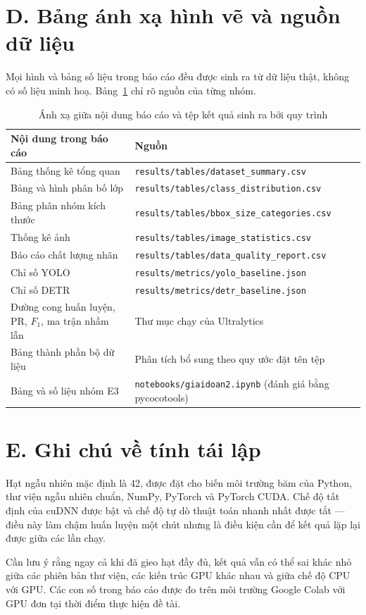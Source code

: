 \section*{D. Bảng ánh xạ hình vẽ và nguồn dữ liệu}

Mọi hình và bảng số liệu trong báo cáo đều được sinh ra từ dữ liệu thật, không có số liệu minh
hoạ. Bảng~\ref{tab:anhxa} chỉ rõ nguồn của từng nhóm.

\begin{table}[H]
\centering
\caption{Ánh xạ giữa nội dung báo cáo và tệp kết quả sinh ra bởi quy trình}
\label{tab:anhxa}
\small
\begin{tabular}{p{5.6cm} p{7.9cm}}
\toprule
\textbf{Nội dung trong báo cáo} & \textbf{Nguồn} \\
\midrule
Bảng thống kê tổng quan     & \texttt{results/tables/dataset\_summary.csv} \\
Bảng và hình phân bố lớp    & \texttt{results/tables/class\_distribution.csv} \\
Bảng phân nhóm kích thước   & \texttt{results/tables/bbox\_size\_categories.csv} \\
Thống kê ảnh                & \texttt{results/tables/image\_statistics.csv} \\
Báo cáo chất lượng nhãn     & \texttt{results/tables/data\_quality\_report.csv} \\
Chỉ số YOLO                 & \texttt{results/metrics/yolo\_baseline.json} \\
Chỉ số DETR                 & \texttt{results/metrics/detr\_baseline.json} \\
Đường cong huấn luyện, PR, $F_1$, ma trận nhầm lẫn & Thư mục chạy của Ultralytics \\
Bảng thành phần bộ dữ liệu & Phân tích bổ sung theo quy ước đặt tên tệp \\
 Bảng và số liệu nhóm E3     & \texttt{notebooks/giaidoan2.ipynb} (đánh giá bằng pycocotools) \\
\bottomrule
\end{tabular}
\end{table}

\section*{E. Ghi chú về tính tái lập}

Hạt ngẫu nhiên mặc định là 42, được đặt cho biến môi trường băm của Python, thư viện ngẫu nhiên
chuẩn, NumPy, PyTorch và PyTorch CUDA. Chế độ tất định của cuDNN được bật và chế độ tự dò thuật
toán nhanh nhất được tắt --- điều này làm chậm huấn luyện một chút nhưng là điều kiện cần để kết
quả lặp lại được giữa các lần chạy.

Cần lưu ý rằng ngay cả khi đã gieo hạt đầy đủ, kết quả vẫn có thể sai khác nhỏ giữa các phiên bản
thư viện, các kiến trúc GPU khác nhau và giữa chế độ CPU với GPU. Các con số trong báo cáo được đo
trên môi trường Google Colab với GPU đơn tại thời điểm thực hiện đề tài.
